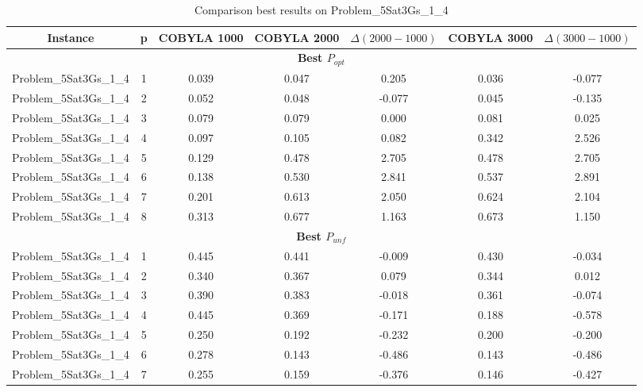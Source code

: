\begin{table}[!htbp]
    \renewcommand{\arraystretch}{0.7}
    \scriptsize
    \centering
    \caption{Comparison best results on Problem\_5Sat3Gs\_1\_4}
    \begin{adjustbox}{max width=\columnwidth}
        \begin{tabularx}{\columnwidth}{c|c c c c c c}
            \toprule
            \textbf{Instance} & \textbf{p} & \textbf{COBYLA 1000} & \textbf{COBYLA 2000} & $\Delta(2000-1000)$ & \textbf{COBYLA 3000} & $\Delta(3000-1000)$ \\
            \midrule
            \multicolumn{7}{c}{\textbf{Best $P_{opt}$}} \\ \midrule
            Problem\_5Sat3Gs\_1\_4 & 1 & 0.039 & 0.047 & 0.205 & 0.036 & -0.077 \\
            Problem\_5Sat3Gs\_1\_4 & 2 & 0.052 & 0.048 & -0.077 & 0.045 & -0.135 \\
            Problem\_5Sat3Gs\_1\_4 & 3 & 0.079 & 0.079 & 0.000 & 0.081 & 0.025 \\
            Problem\_5Sat3Gs\_1\_4 & 4 & 0.097 & 0.105 & 0.082 & 0.342 & 2.526 \\
            Problem\_5Sat3Gs\_1\_4 & 5 & 0.129 & 0.478 & 2.705 & 0.478 & 2.705 \\
            Problem\_5Sat3Gs\_1\_4 & 6 & 0.138 & 0.530 & 2.841 & 0.537 & 2.891 \\
            Problem\_5Sat3Gs\_1\_4 & 7 & 0.201 & 0.613 & 2.050 & 0.624 & 2.104 \\
            Problem\_5Sat3Gs\_1\_4 & 8 & 0.313 & 0.677 & 1.163 & 0.673 & 1.150 \\
            \multicolumn{7}{c}{\textbf{Best $P_{unf}$}} \\ \midrule
            Problem\_5Sat3Gs\_1\_4 & 1 & 0.445 & 0.441 & -0.009 & 0.430 & -0.034 \\
            Problem\_5Sat3Gs\_1\_4 & 2 & 0.340 & 0.367 & 0.079 & 0.344 & 0.012 \\
            Problem\_5Sat3Gs\_1\_4 & 3 & 0.390 & 0.383 & -0.018 & 0.361 & -0.074 \\
            Problem\_5Sat3Gs\_1\_4 & 4 & 0.445 & 0.369 & -0.171 & 0.188 & -0.578 \\
            Problem\_5Sat3Gs\_1\_4 & 5 & 0.250 & 0.192 & -0.232 & 0.200 & -0.200 \\
            Problem\_5Sat3Gs\_1\_4 & 6 & 0.278 & 0.143 & -0.486 & 0.143 & -0.486 \\
            Problem\_5Sat3Gs\_1\_4 & 7 & 0.255 & 0.159 & -0.376 & 0.146 & -0.427 \\

\end{tabularx}
\end{adjustbox}
\end{table}
